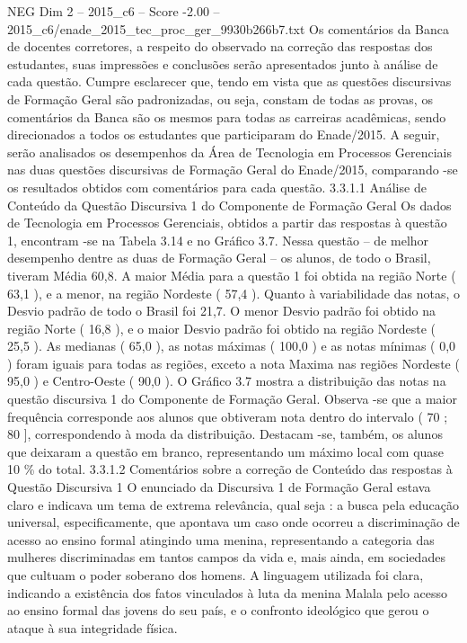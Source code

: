 \begin{textsample}{NEG Dim 2 – 2015\_c6 – Score -2.00 – 2015\_c6/enade\_2015\_tec\_proc\_ger\_9930b266b7.txt}
Os comentários da Banca de docentes corretores, a respeito do observado na correção das respostas dos estudantes, suas impressões e conclusões serão apresentados junto à análise de cada questão.
Cumpre esclarecer que, tendo em vista que as questões discursivas de Formação Geral são padronizadas, ou seja, constam de todas as provas, os comentários da Banca são os mesmos para todas as carreiras acadêmicas, sendo direcionados a todos os estudantes que participaram do Enade/2015.
A seguir, serão analisados os desempenhos da Área de Tecnologia em Processos Gerenciais nas duas questões discursivas de Formação Geral do Enade/2015, comparando -se os resultados obtidos com comentários para cada questão. 3.3.1.1 Análise de Conteúdo da Questão Discursiva 1 do Componente de Formação Geral Os dados de Tecnologia em Processos Gerenciais, obtidos a partir das respostas à questão 1, encontram -se na Tabela 3.14 e no Gráfico 3.7.
Nessa questão – de melhor desempenho dentre as duas de Formação Geral – os alunos, de todo o Brasil, tiveram Média 60,8.
A maior Média para a questão 1 foi obtida na região Norte ( 63,1 ), e a menor, na região Nordeste ( 57,4 ).
Quanto à variabilidade das notas, o Desvio padrão de todo o Brasil foi 21,7.
O menor Desvio padrão foi obtido na região Norte ( 16,8 ), e o maior Desvio padrão foi obtido na região Nordeste ( 25,5 ).
As medianas ( 65,0 ), as notas máximas ( 100,0 ) e as notas mínimas ( 0,0 ) foram iguais para todas as regiões, exceto a nota Maxima nas regiões Nordeste ( 95,0 ) e Centro-Oeste ( 90,0 ).
O Gráfico 3.7 mostra a distribuição das notas na questão discursiva 1 do Componente de Formação Geral.
Observa -se que a maior frequência corresponde aos alunos que obtiveram nota dentro do intervalo ( 70 ; 80 ], correspondendo à moda da distribuição.
Destacam -se, também, os alunos que deixaram a questão em branco, representando um máximo local com quase 10 \% do total. 3.3.1.2 Comentários sobre a correção de Conteúdo das respostas à Questão Discursiva 1 O enunciado da Discursiva 1 de Formação Geral estava claro e indicava um tema de extrema relevância, qual seja : a busca pela educação universal, especificamente, que apontava um caso onde ocorreu a discriminação de acesso ao ensino formal atingindo uma menina, representando a categoria das mulheres discriminadas em tantos campos da vida e, mais ainda, em sociedades que cultuam o poder soberano dos homens.
A linguagem utilizada foi clara, indicando a existência dos fatos vinculados à luta da menina Malala pelo acesso ao ensino formal das jovens do seu país, e o confronto ideológico que gerou o ataque à sua integridade física.

\end{textsample}
